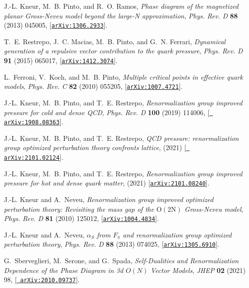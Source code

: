 \documentclass[a4paper,11pt]{article}
\begin{document}
\begin{thebibliography}{10}
J.-L. Kneur, M.~B. Pinto, and R.~O. Ramos, {\it Phase diagram of the magnetized
  planar \textrm{Gross-Neveu} model beyond the large-\textrm{N} approximation},
   {\em Phys. Rev. D} {\bf 88} (2013) 045005,
  [\href{http://arxiv.org/abs/1306.2933}{{\tt arXiv:1306.2933}}].

T.~E. Restrepo, J.~C. Macias, M.~B. Pinto, and G.~N. Ferrari, {\it Dynamical
  generation of a repulsive vector contribution to the quark pressure},  {\em
  Phys. Rev. D} {\bf 91} (2015) 065017,
  [\href{http://arxiv.org/abs/1412.3074}{{\tt arXiv:1412.3074}}].

L.~Ferroni, V.~Koch, and M.~B. Pinto, {\it Multiple critical points in
  effective quark models},  {\em Phys. Rev. C} {\bf 82} (2010) 055205,
  [\href{http://arxiv.org/abs/1007.4721}{{\tt arXiv:1007.4721}}].

J.-L. Kneur, M.~B. Pinto, and T.~E. Restrepo, {\it Renormalization group
  improved pressure for cold and dense \textrm{QCD}},  {\em Phys. Rev. D} {\bf
  100} (2019) 114006, [\href{http://arxiv.org/abs/1908.08363}{{\tt
  arXiv:1908.08363}}].

J.-L. Kneur, M.~B. Pinto, and T.~E. Restrepo, {\it \textrm{QCD} pressure:
  renormalization group optimized perturbation theory confronts lattice},  {\em
  \mbox{}} (2021) [\href{http://arxiv.org/abs/2101.02124}{{\tt
  arXiv:2101.02124}}].

J.-L. Kneur, M.~B. Pinto, and T.~E. Restrepo, {\it Renormalization group
  improved pressure for hot and dense quark matter},  {\em \mbox{}} (2021)
  [\href{http://arxiv.org/abs/2101.08240}{{\tt arXiv:2101.08240}}].

J.-L. Kneur and A.~Neveu, {\it Renormalization group improved optimized
  perturbation theory: Revisiting the mass gap of the $\textrm{O}(2\textrm{N})$
  \textrm{Gross-Neveu} model},  {\em Phys. Rev. D} {\bf 81} (2010) 125012,
  [\href{http://arxiv.org/abs/1004.4834}{{\tt arXiv:1004.4834}}].

J.-L. Kneur and A.~Neveu, {\it ${\ensuremath{\alpha}}_{S}$ from
  ${F}_{\ensuremath{\pi}}$ and renormalization group optimized perturbation
  theory},  {\em Phys. Rev. D} {\bf 88} (2013) 074025,
  [\href{http://arxiv.org/abs/1305.6910}{{\tt arXiv:1305.6910}}].

G.~Sberveglieri, M.~Serone, and G.~Spada, {\it {Self-Dualities and
  Renormalization Dependence of the Phase Diagram in 3d $O(N)$ Vector Models}},
   {\em JHEP} {\bf 02} (2021) 98, [\href{http://arxiv.org/abs/2010.09737}{{\tt
  arXiv:2010.09737}}].


\end{thebibliography}
\end{document}

